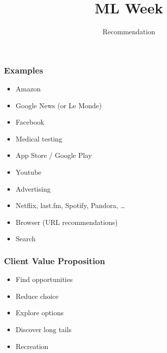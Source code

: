 
\usepackage{centernot}
\usepackage[]{algorithm2e}

\title
{ML Week}
\subtitle{Recommendation}




\begin{frame}
  \titlepage
\end{frame}




\begin{frame}
  \frametitle{Examples}
  \begin{itemize}
  \item Amazon
  \item Google News (or Le Monde)
  \item Facebook
  \item Medical testing
  \item App Store / Google Play
  \item Youtube
  \item Advertising
  \item Netflix, last.fm, Spotify, Pandora, \dots
  \item Browser (URL recommendations)
  \item Search
  \end{itemize}
\end{frame}

\begin{frame}
  \frametitle{Client Value Proposition}
  \begin{itemize}
  \item Find opportunities
  \item Reduce choice
  \item Explore options
  \item Discover long tails
  \item Recreation
  \end{itemize}
\end{frame}

